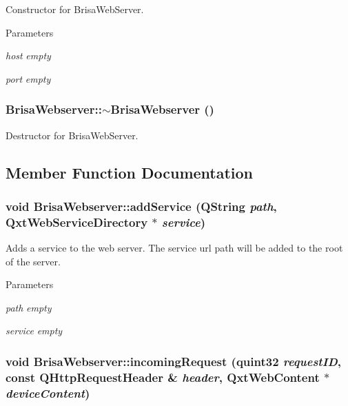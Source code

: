 Constructor for BrisaWebServer. 
\begin{DoxyParams}{Parameters}
\item[{\em host}]{\itshape empty\/} \item[{\em port}]{\itshape empty\/} \end{DoxyParams}
\hypertarget{classBrisaCore_1_1BrisaWebserver_afae61d5b3a9ec359b865229d2c974be4}{
\subsubsection[{$\sim$BrisaWebserver}]{\setlength{\rightskip}{0pt plus 5cm}BrisaWebserver::$\sim$BrisaWebserver ()}}
\label{classBrisaCore_1_1BrisaWebserver_afae61d5b3a9ec359b865229d2c974be4}


Destructor for BrisaWebServer. 

\subsection{Member Function Documentation}
\hypertarget{classBrisaCore_1_1BrisaWebserver_aec1ac4b58fa38f7099e7d67a8b09b8ba}{
\subsubsection[{addService}]{\setlength{\rightskip}{0pt plus 5cm}void BrisaWebserver::addService (QString {\em path}, \/  QxtWebServiceDirectory $\ast$ {\em service})}}
\label{classBrisaCore_1_1BrisaWebserver_aec1ac4b58fa38f7099e7d67a8b09b8ba}


Adds a service to the web server. The service url path will be added to the root of the server.


\begin{DoxyParams}{Parameters}
\item[{\em path}]{\itshape empty\/} \item[{\em service}]{\itshape empty\/} \end{DoxyParams}
\hypertarget{classBrisaCore_1_1BrisaWebserver_af40a4df2aef119afad2a6e9dc9bb28a0}{
\subsubsection[{incomingRequest}]{\setlength{\rightskip}{0pt plus 5cm}void BrisaWebserver::incomingRequest (quint32 {\em requestID}, \/  const QHttpRequestHeader \& {\em header}, \/  QxtWebContent $\ast$ {\em deviceContent})}}
\label{classBrisaCore_1_1BrisaWebserver_af40a4df2aef119afad2a6e9dc9bb28a0}



